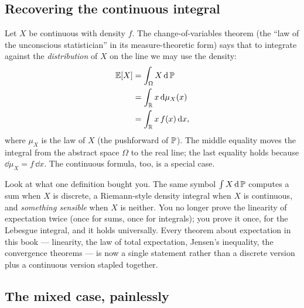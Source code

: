 \subsection{Recovering the continuous integral}

Let $X$ be continuous with density $f$. The change-of-variables theorem (the
``law of the unconscious statistician'' in its measure-theoretic form) says that
to integrate against the \emph{distribution} of $X$ on the line we may use the
density:
\begin{align*}
  \E[X] &= \int_\Omega X\,\dd\P \\
        &= \int_\R x \,\dd\mu_X(x) \\
        &= \int_\R x\, f(x)\,\dd x ,
\end{align*}
where $\mu_X$ is the law of $X$ (the pushforward of $\P$). The middle equality
moves the integral from the abstract space $\Omega$ to the real line; the last
equality holds because $\dd\mu_X = f\,\dd x$. The continuous formula, too, is a
special case.

\begin{aestheticbox}
Look at what one definition bought you. The same symbol
$\int X\,\dd\P$ computes a sum when $X$ is discrete, a Riemann-style density
integral when $X$ is continuous, and \emph{something sensible} when $X$ is
neither. You no longer prove the linearity of expectation twice (once for sums,
once for integrals); you prove it once, for the Lebesgue integral, and it holds
universally. Every theorem about expectation in this book --- linearity, the law
of total expectation, Jensen's inequality, the convergence theorems --- is now a
single statement rather than a discrete version plus a continuous version
stapled together.
\end{aestheticbox}

\subsection{The mixed case, painlessly}

